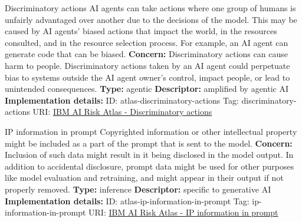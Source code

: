 \begin{definitionbox}{Discriminatory actions}
AI agents can take actions where one group of humans is unfairly advantaged over another due to the decisions of the model. This may be caused by AI agents' biased actions that impact the world, in the resources consulted, and in the resource selection process. For example, an AI agent can generate code that can be biased.\newline\newline
\textbf{Concern: }Discriminatory actions can cause harm to people. Discriminatory actions taken by an AI agent could perpetuate bias to systems outside the AI agent owner's control,  impact people, or lead to unintended consequences.\newline\newline
\textbf{Type: }agentic\newline
\textbf{Descriptor: }amplified by agentic AI \newline\newline
\textbf{Implementation details: } \newline
ID: atlas-discriminatory-actions \newline
Tag: discriminatory-actions \newline
URI:  \href{https://www.ibm.com/docs/en/watsonx/saas?topic=SSYOK8/wsj/ai-risk-atlas/discriminatory-actions.html}{IBM AI Risk Atlas - Discriminatory actions}\newline
\end{definitionbox}
\begin{definitionbox}{IP information in prompt}
Copyrighted information or other intellectual property might be included as a part of the prompt that is sent to the model.\newline\newline
\textbf{Concern: }Inclusion of such data might result in it being disclosed in the model output. In addition to accidental disclosure, prompt data might be used for other purposes like model evaluation and retraining, and might appear in their output if not properly removed.\newline\newline
\textbf{Type: }inference\newline
\textbf{Descriptor: }specific to generative AI \newline\newline
\textbf{Implementation details: } \newline
ID: atlas-ip-information-in-prompt \newline
Tag: ip-information-in-prompt \newline
URI:  \href{https://www.ibm.com/docs/en/watsonx/saas?topic=SSYOK8/wsj/ai-risk-atlas/ip-information-in-prompt.html}{IBM AI Risk Atlas - IP information in prompt}\newline
\end{definitionbox}
